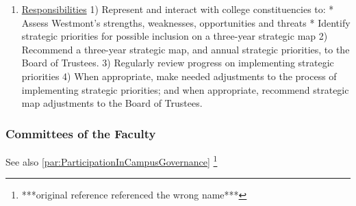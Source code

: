 \documentclass[letterpaper, 11pt]{article}
\newcommand{\fix}[1]{\footnote{***#1***}}
\begin{document}
\begin{enumerate}[label=\alph*)]
					\item{\underline{Responsibilities}
						1) Represent and interact with college constituencies to:
						* Assess Westmont's strengths, weaknesses, opportunities and threats
						* Identify strategic priorities for possible inclusion on a three-year strategic map
						2) Recommend a three-year strategic map, and annual strategic priorities, to the Board of Trustees.
						3) Regularly review progress on implementing strategic priorities
						4) When appropriate, make needed adjustments to the process of implementing strategic priorities; and when appropriate, recommend strategic map adjustments to the Board of Trustees.}
				\end{enumerate}
		\subsubsection{Committees of the Faculty}
			See also
			\autoref{par:ParticipationInCampusGovernance}
			\fix{original reference referenced the wrong name}
\end{document}

